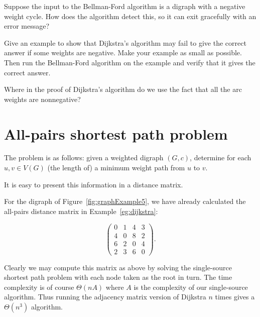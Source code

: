 \begin{Exercise}\label{ex:bellman-neg-cycle}
Suppose the input to the Bellman-Ford algorithm is a digraph with a
negative weight cycle. How does the algorithm detect this, so it can
exit gracefully with an error message?

\end{Exercise}

\begin{Exercise}\label{ex:dijk-neg-fails}
Give an example to show that Dijkstra's algorithm may fail to give the
correct answer if some weights are negative. Make your example as small as
possible. Then run the Bellman-Ford algorithm on the example and verify
that it gives the correct answer.

\end{Exercise}

\begin{Exercise}
\label{ex:dijk-proof}
Where in the proof of Dijkstra's algorithm do we use the fact that all the arc weights are nonnegative?

\end{Exercise}

\section{All-pairs shortest path problem}
\label{sec:APSP}

The problem is as follows: given a weighted digraph $(G, c)$, determine
for each $u, v\in V(G)$ (the length of) a minimum weight path from $u$
to $v$.

It is easy to present this information in a distance matrix.

\begin{Example}
\label{eg:APSP}
For the digraph of Figure~\ref{fig:graphExample5}, we have already
calculated the all-pairs distance matrix in Example~\ref{eg:dijkstra}:

$$
\left(
\begin{matrix}
0 & 1 & 4 & 3 \\
4 & 0 & 8 & 2 \\
6 & 2 & 0 & 4 \\
2 & 3 & 6 & 0
\end{matrix}
\right).
$$

\end{Example}

Clearly we may compute this matrix as above by solving the single-source
shortest path problem with each node taken as the root in turn. The time
complexity is of course $\Theta(nA)$ where $A$ is the complexity of our
single-source algorithm. Thus running the adjacency matrix version of
Dijkstra $n$ times gives a $\Theta(n^3)$ algorithm.

